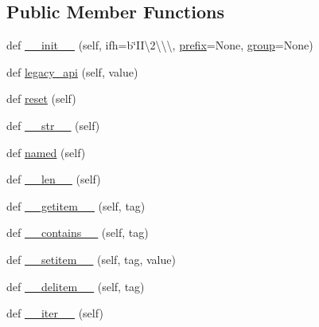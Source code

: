 \subsection*{Public Member Functions}
\begin{DoxyCompactItemize}
\item 
def \hyperlink{classPIL_1_1TiffImagePlugin_1_1ImageFileDirectory__v2_aae95cdd3aad5c230fdbe6b27e03e38c5}{\+\_\+\+\_\+init\+\_\+\+\_\+} (self, ifh=b\char`\"{}I\+I\textbackslash{}2\textbackslash{}\textbackslash{}\textbackslash{}, \hyperlink{classPIL_1_1TiffImagePlugin_1_1ImageFileDirectory__v2_ab19686806aa3bb80dc576b47dd8f2194}{prefix}=None, \hyperlink{classPIL_1_1TiffImagePlugin_1_1ImageFileDirectory__v2_a6d657459b9e6de6a30e661c8dbd1e5f8}{group}=None)
\item 
def \hyperlink{classPIL_1_1TiffImagePlugin_1_1ImageFileDirectory__v2_a0cc7b85d0e725eb05a932864845d05dd}{legacy\+\_\+api} (self, value)
\item 
def \hyperlink{classPIL_1_1TiffImagePlugin_1_1ImageFileDirectory__v2_ab37501fecb6a9b9e001ff5b5c6b6d82b}{reset} (self)
\item 
def \hyperlink{classPIL_1_1TiffImagePlugin_1_1ImageFileDirectory__v2_aca034000916931edc7644b78c160ba98}{\+\_\+\+\_\+str\+\_\+\+\_\+} (self)
\item 
def \hyperlink{classPIL_1_1TiffImagePlugin_1_1ImageFileDirectory__v2_ad6b46f1ba2a7e6b08b2abec1f5609494}{named} (self)
\item 
def \hyperlink{classPIL_1_1TiffImagePlugin_1_1ImageFileDirectory__v2_ac136c45ab1168048e3f2c54fb910f134}{\+\_\+\+\_\+len\+\_\+\+\_\+} (self)
\item 
def \hyperlink{classPIL_1_1TiffImagePlugin_1_1ImageFileDirectory__v2_af39a25d13a76bbc9eaab496ba924aa1c}{\+\_\+\+\_\+getitem\+\_\+\+\_\+} (self, tag)
\item 
def \hyperlink{classPIL_1_1TiffImagePlugin_1_1ImageFileDirectory__v2_aa6c2acdc44209ccfa90f8726d6ae4a22}{\+\_\+\+\_\+contains\+\_\+\+\_\+} (self, tag)
\item 
def \hyperlink{classPIL_1_1TiffImagePlugin_1_1ImageFileDirectory__v2_add448ad169025e1e82bfbabbfa2e50b1}{\+\_\+\+\_\+setitem\+\_\+\+\_\+} (self, tag, value)
\item 
def \hyperlink{classPIL_1_1TiffImagePlugin_1_1ImageFileDirectory__v2_a0be7f82680895a72103e2ea34886a687}{\+\_\+\+\_\+delitem\+\_\+\+\_\+} (self, tag)
\item 
def \hyperlink{classPIL_1_1TiffImagePlugin_1_1ImageFileDirectory__v2_a95a92444612175e09a940d7784b4d0c5}{\+\_\+\+\_\+iter\+\_\+\+\_\+} (self)

\end{DoxyCompactItemize}
